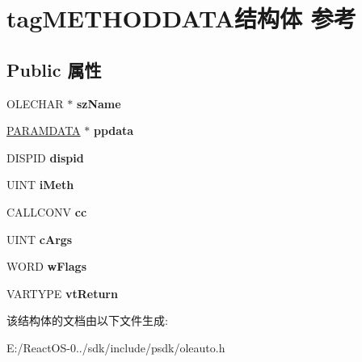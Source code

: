 \hypertarget{structtag_m_e_t_h_o_d_d_a_t_a}{}\section{tag\+M\+E\+T\+H\+O\+D\+D\+A\+T\+A结构体 参考}
\label{structtag_m_e_t_h_o_d_d_a_t_a}
\subsection*{Public 属性}
\begin{DoxyCompactItemize}
\item 
\mbox{\label{structtag_m_e_t_h_o_d_d_a_t_a_ab0b9c34be5f5722037fdc89d12c8dd3c}} 
O\+L\+E\+C\+H\+AR $\ast$ {\bfseries sz\+Name}
\item 
\mbox{\label{structtag_m_e_t_h_o_d_d_a_t_a_a6d7005c8ed99acaa13154ef134b2634f}} 
\hyperlink{structtag_p_a_r_a_m_d_a_t_a}{P\+A\+R\+A\+M\+D\+A\+TA} $\ast$ {\bfseries ppdata}
\item 
\mbox{\label{structtag_m_e_t_h_o_d_d_a_t_a_a56fcce51e67a30cebd7fa828584ceaae}} 
D\+I\+S\+P\+ID {\bfseries dispid}
\item 
\mbox{\label{structtag_m_e_t_h_o_d_d_a_t_a_a61866d4f0abf6a1b49bdb5144d2929a1}} 
U\+I\+NT {\bfseries i\+Meth}
\item 
\mbox{\label{structtag_m_e_t_h_o_d_d_a_t_a_a8f63f06082331a3e432ac9e0fdedda4b}} 
C\+A\+L\+L\+C\+O\+NV {\bfseries cc}
\item 
\mbox{\label{structtag_m_e_t_h_o_d_d_a_t_a_a6e004293e79214809001adfa0f1756f6}} 
U\+I\+NT {\bfseries c\+Args}
\item 
\mbox{\label{structtag_m_e_t_h_o_d_d_a_t_a_a71033ee41a405e04fb229c1354587b83}} 
W\+O\+RD {\bfseries w\+Flags}
\item 
\mbox{\label{structtag_m_e_t_h_o_d_d_a_t_a_a6b52a167fe9ae1b00e40fb1bd8d2bccb}} 
V\+A\+R\+T\+Y\+PE {\bfseries vt\+Return}
\end{DoxyCompactItemize}


该结构体的文档由以下文件生成\+:\begin{DoxyCompactItemize}
\item 
E\+:/\+React\+O\+S-\/0../sdk/include/psdk/oleauto.\+h\end{DoxyCompactItemize}
